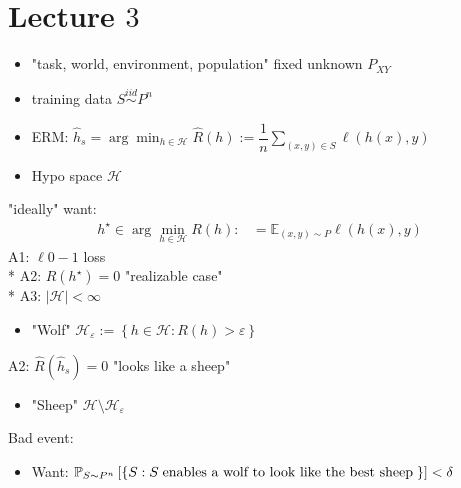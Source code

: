 \documentclass{article}
\begin{document}
\section{Lecture $3$} 
\begin{itemize}
\item "task, world, environment, population" fixed unknown $P_{XY}$
\item training data $S  \stackrel{iid}{\sim} P^{n}$
\item ERM: $\hat{h}_{s} = \arg\displaystyle\min_{h \in \mathcal{H}} \hat{R}\left(h\right) := \dfrac{1}{n} \displaystyle\sum_{\left(x, y\right) \in S} \ell\left(h\left(x\right), y\right)$
\item Hypo space $\mathcal{H}$
\end{itemize}
"ideally" want:
\begin{align*}
h^\star  \in \arg\displaystyle\min_{h \in \mathcal{H}} R\left(h\right) :&= \mathbb{E}_{\left(x, y\right) \sim  P} \ell\left(h\left(x\right), y\right)
\end{align*}
A1: $\ell 0-1$ loss
\\* A2: $R\left(h^\star \right)  = 0$ "realizable case"
\\* A3: $| \mathcal{H} | < \infty$
\newline \newline
\begin{itemize}
\item "Wolf" $\mathcal{H}_{\varepsilon} := \left\{h \in \mathcal{H} : R\left(h\right) > \varepsilon\right\}$
\end{itemize}A2: $\hat{R}\left(\hat{h}_{s}\right) = 0$ "looks like a sheep"
\begin{itemize}
\item "Sheep" $\mathcal{H} \setminus  \mathcal{H}_{\varepsilon}$
\end{itemize}
Bad event:
\begin{itemize}
\item Want: $\mathbb{P}_{S \sim  P^{n}} \left[\left\{S  : S  \text{\;enables a wolf to look like the best sheep\;} \right\}\right] < \delta$
\end{itemize}
\begin{figure}[H] \centering {} 
\end{figure}
\end{document}

